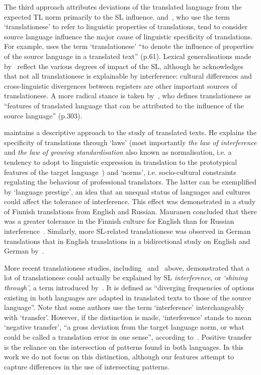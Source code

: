 The third approach attributes deviations of the translated language from the expected TL norm primarily to the SL influence. \citet{Gellerstam1986} and~\citet{Santos1995}, who use the term `translationese' to refer to linguistic properties of translations, tend to consider source language influence the major cause of linguistic specificity of translations. For example, \citet{Santos1995} uses the term `translationese' ``to denote the influence of properties of the source language in a translated text'' (p.61). Lexical generalisations made by~\citet{Gellerstam1986} reflect the various degrees of impact of the SL, although he acknowledges that not all translationese is explainable by interference: cultural differences and cross-linguistic divergences between registers are other important sources of translationese. A more radical stance is taken by~\citet{Rabadan2009}, who defines translationese as ``features of translated language that can be attributed to the influence of the source language'' (p.303).

\citet{Toury1995} maintains a descriptive approach to the study of translated texts. He explains the specificity of translations through `laws' (most importantly \textit{the law of interference} and \textit{the law of growing standardisation} also known as normalisation, i.e. a tendency to adopt to linguistic expression in translation to the prototypical features of the target language~\cite{Denturck2009}) and `norms', i.e. socio-cultural constraints regulating the behaviour of professional translators. The latter can be exemplified by `language prestige', an idea that an unequal status of languages and cultures could affect the tolerance of interference. This effect was demonstrated in a study of Finnish translations from English and Russian. Mauranen concluded that there was a greater tolerance in the Finnish culture for English than for Russian interference~\cite[p.72]{Mauranen2004}. Similarly, more SL-related translationese was observed in German translations that in English translations in a bidirectional study on English and German by~\citet{Evert2017}. 

More recent translationese studies, including~\cite{Koppel2011,Volansky2015,Rabinovich2017,Chowdhury2020,Chowdhury2021,Kunilovskaya2020vars} and~\cite{Evert2017} above, demonstrated that a lot of translationese could actually be explained by SL \textit{interference}, or \textit{`shining through'}, a term introduced by~\citet{Teich2003}. It is defined as ``diverging frequencies of options existing in both languages are adapted in translated texts to those of the source language''. %
Note that some authors use the term `interference' interchangeably with `transfer'. However, if the distinction is made, `interference' stands to mean `negative transfer', ``a gross deviation from the target language norm, or what could be called a translation error in one sense'', according to~\citet[p.71--72]{Mauranen2004}. Positive transfer is the reliance on the intersection of patterns found in both languages. In this work we do not focus on this distinction, although our features attempt to capture differences in the use of intersecting patterns.

